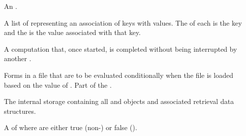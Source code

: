 

\begin{glossary-list}
  
  
\glent[alist]
%
%
An .


%
%
A list of  representing an association of keys with values. The
 of each  is the key and the  is the value
associated with that key.


%
%
A computation that, once started, is completed without being interrupted by
another .


%
%
Forms in a  file that are to be evaluated conditionally when the
file is loaded based on the value of .
Part of the .


%
%
The internal storage containing all  and
 objects and associated retrieval data structures.


%
%
%
%
A  of   where
  are either true (non-\nil) or
false (\nil).


\end{glossary-list}
